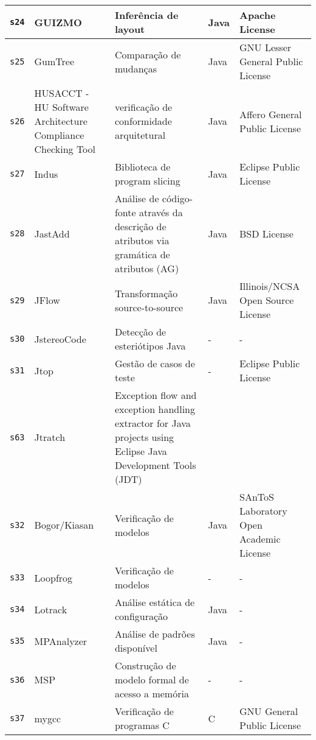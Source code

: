 \begin{longtable}{| l | p{4.5cm} | p{7cm} | p{2.5cm} | p{2.5cm} |}
    \hline
    \texttt{s24} &
      GUIZMO &
      Inferência de layout &
      Java &
      Apache License \\
    \hline
    \texttt{s25} &
      GumTree &
      Comparação de mudanças &
      Java &
      GNU Lesser General Public License \\
    \hline
    \texttt{s26} &
      HUSACCT - HU Software Architecture Compliance Checking Tool &
      verificação de conformidade arquitetural &
      Java &
      Affero General Public License \\
    \hline
    \texttt{s27} &
      Indus &
      Biblioteca de program slicing &
      Java &
      Eclipse Public License \\
    \hline
    \texttt{s28} &
      JastAdd &
      Análise de código-fonte através da descrição de atributos via gramática de atributos (AG) &
      Java &
      BSD License \\
    \hline
    \texttt{s29} &
      JFlow &
      Transformação source-to-source &
      Java &
      Illinois/NCSA Open Source License \\
    \hline
    \texttt{s30} &
      JstereoCode &
      Detecção de esteriótipos Java &
      - &
      - \\
    \hline
    \texttt{s31} &
      Jtop &
      Gestão de casos de teste &
      - &
      Eclipse Public License \\
    \hline
    \texttt{s63} &
      Jtratch &
      Exception flow and exception handling extractor for Java projects using Eclipse Java Development Tools (JDT) &
       &
       \\
    \hline
    \texttt{s32} &
      Bogor/Kiasan &
      Verificação de modelos &
      Java &
      SAnToS Laboratory Open Academic License \\
    \hline
    \texttt{s33} &
      Loopfrog &
      Verificação de modelos &
      - &
      - \\
    \hline
    \texttt{s34} &
      Lotrack &
      Análise estática de configuração &
      Java &
      - \\
    \hline
    \texttt{s35} &
      MPAnalyzer &
      Análise de padrões disponível &
      Java &
      - \\
    \hline
    \texttt{s36} &
      MSP &
      Construção de modelo formal de acesso a memória &
      - &
      - \\
    \hline
    \texttt{s37} &
      mygcc &
      Verificação de programas C &
      C &
      GNU General Public License \\

\end{longtable}
